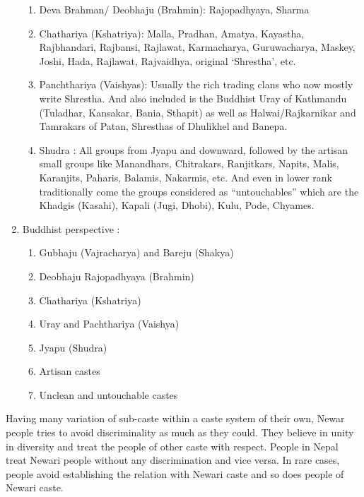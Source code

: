 \documentclass[a4paper,13pt, margin=0.9in]{article}
\begin{document}
\begin{flushleft}
\begin{enumerate}
    \begin{enumerate}
    
    
        \item Deva Brahman/ Deobhaju (Brahmin): Rajopadhyaya, Sharma
        \item Chathariya (Kshatriya): Malla, Pradhan, Amatya, Kayastha, Rajbhandari, Rajbansi, Rajlawat, Karmacharya,  Guruwacharya, Maskey, Joshi, Hada, Rajlawat, Rajvaidhya, original ‘Shrestha’, etc.
        \item Panchthariya (Vaishyas): Usually the rich trading clans who now mostly write Shrestha. And also included is the Buddhist Uray of Kathmandu (Tuladhar, Kansakar, Bania, Sthapit) as well as Halwai/Rajkarnikar and Tamrakars of Patan, Shresthas of Dhulikhel and Banepa.
        \item Shudra : All groups from Jyapu and downward, followed by the artisan small groups like Manandhars, Chitrakars, Ranjitkars, Napits, Malis, Karanjits, Paharis, Balamis, Nakarmis, etc. And even in lower rank traditionally come the groups considered as “untouchables” which are the Khadgis (Kasahi), Kapali (Jugi, Dhobi), Kulu, Pode, Chyames.
        
      \end{enumerate}
   \item  Buddhist perspective :
   
   \begin{enumerate}
   
   

    \item Gubhaju (Vajracharya) and Bareju (Shakya)
    \item Deobhaju Rajopadhyaya (Brahmin)
    \item Chathariya (Kshatriya)
    \item Uray and Pachthariya (Vaishya)
    \item Jyapu (Shudra)
    \item Artisan castes
    \item Unclean and untouchable castes
    
    \end{enumerate}
    
\end{enumerate}

Having many variation of sub-caste within a caste system of their own, Newar people tries to avoid discriminality as much as they could. They believe in unity in diversity and treat the people of other caste with respect. People in Nepal treat Newari people without any discrimination and vice versa. In rare cases, people avoid establishing the relation with Newari caste and so does people of Newari caste. 


\end{flushleft}
\end{document}
